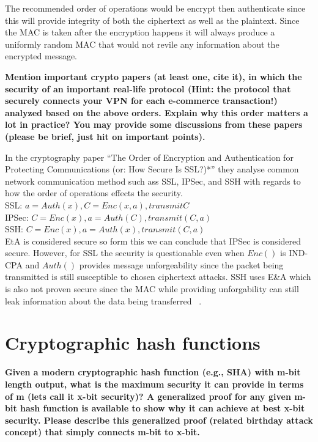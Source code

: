 \documentclass[letterpaper,11pt,notitlepage,fleqn]{article}
\begin{document}
The recommended order of operations would be encrypt then authenticate since this will provide integrity of both the ciphertext as well as the plaintext. Since the MAC is taken after the encryption happens it will always produce a uniformly random MAC that would not revile any information about the encrypted message. 

\noindent \textbf{Mention important crypto papers (at least one, cite it), in which the security of an important real-life  protocol  (Hint:  the  protocol  that  securely  connects  your  VPN  for  each  e-commerce transaction!)  analyzed  based  on  the  above  orders.  Explain  why  this  order  matters  a  lot  in practice?  You  may  provide  some  discussions  from  these  papers  (please  be  brief,  just  hit  on important points).}

In the cryptography paper ``The Order of Encryption and Authentication for Protecting Communications (or: How Secure Is SSL?)*'' they analyse common network communication method such ass SSL, IPSec, and SSH with regards to how the order of operations effects the security. \\
SSL: $a = Auth(x), C = Enc(x,a), transmit C$ \\ 
IPSec: $C = Enc(x), a = Auth(C), transmit (C,a)$ \\ 
SSH: $C = Enc(x), a = Auth(x), transmit (C,a)$ \\

EtA is considered secure so form this we can conclude that IPSec is considered secure. However, for SSL the security is questionable even when $Enc()$ is IND-CPA and $Auth()$ provides message unforgeability since the packet being transmitted is still susceptible to chosen ciphertext attacks. SSH uses E\&A which is also not proven secure since the MAC while providing unforgability can still leak information about the data being transferred ~\cite{krawczy}.
\section{Cryptographic  hash  functions}
\noindent \textbf{Given  a modern  cryptographic  hash  function  (e.g.,  SHA) with m-bit  length  output, what is  the maximum  security  it  can  provide  in  terms  of  m  (lets  call  it  x-bit  security)? A  generalized proof  for  any  given  m-bit  hash  function  is  available  to  show  why  it  can  achieve  at  best  x-bit security.  Please  describe  this  generalized  proof  (related  birthday  attack  concept)  that  simply connects m-bit to x-bit.}
\end{document}
